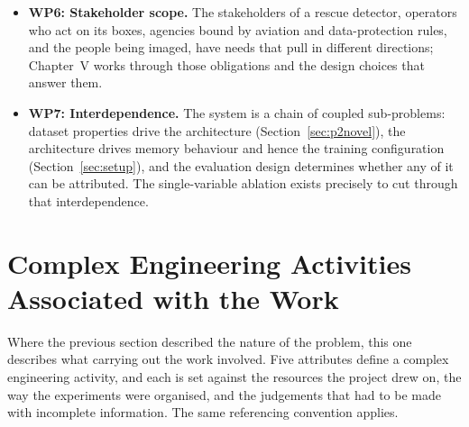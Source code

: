 \begin{itemize}
        (Sections~\ref{sec:metrics} and~\ref{sec:protocol}) had to be designed for the problem.
  \item \textbf{WP6: Stakeholder scope.} The stakeholders of a rescue
        detector, operators who act on its boxes, agencies bound by aviation
        and data-protection rules, and the people being imaged, have needs
        that pull in different directions; Chapter~V works through those
        obligations and the design choices that answer them.
  \item \textbf{WP7: Interdependence.} The system is a chain of coupled
        sub-problems: dataset properties drive the architecture
        (Section~\ref{sec:p2novel}), the architecture drives memory behaviour and hence
        the training configuration (Section~\ref{sec:setup}), and the evaluation design
        determines whether any of it can be attributed. The single-variable
        ablation exists precisely to cut through that interdependence.
\end{itemize}

\section{Complex Engineering Activities Associated with the Work}

Where the previous section described the nature of the problem, this one
describes what carrying out the work involved. Five attributes define a complex
engineering activity, and each is set against the resources the project drew on,
the way the experiments were organised, and the judgements that had to be made
with incomplete information. The same referencing convention applies.

